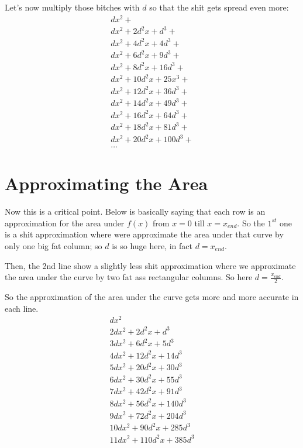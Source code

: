 \documentclass{report}
\begin{document}
Let's now multiply those bitches with $d$ so that the shit gets spread even
more:
\[\begin{split}
  dx^2 + \\
  dx^2 + 2d^2x + d^3 + \\
  dx^2 + 4d^2x + 4d^3 + \\
  dx^2 + 6d^2x + 9d^3 + \\
  dx^2 + 8d^2x + 16d^3 + \\
  dx^2 + 10d^2x + 25x^3 + \\
  dx^2+12d^2x   +36d^3 + \\
  dx^2+14d^2x   +49d^3 + \\
  dx^2+16d^2x   +64d^3 + \\
  dx^2+18d^2x   +81d^3 + \\
  dx^2+20d^2x   +100d^3 + \\
  \ldots
\end{split}\]

\section{Approximating the Area}
Now this is a critical point. Below is basically saying that each row is an
approximation for the area under $f(x)$ from $x = 0$ till $x = x_{end}$. So the
$1^{st}$ one is a shit approximation where were approximate the area under that
curve by only one big fat column; so $d$ is so huge here, in fact $d =
x_{end}$.

Then, the 2nd line show a slightly less shit approximation where we approximate
the area under the curve by two fat ass rectangular columns. So here $d =
\frac{x_{end}}{2}$.

So the approximation of the area under the curve gets more and more accurate in
each line.
\[\begin{split}
  dx^2\\
  2dx^2 + 2d^2x + d^3\\
  3dx^2 + 6d^2x + 5d^3\\
  4dx^2 + 12d^2x + 14d^3\\
  5dx^2 + 20d^2x + 30d^3\\
  6dx^2 + 30d^2x + 55d^3\\
  7dx^2 + 42d^2x + 91d^3\\
  8dx^2 + 56d^2x + 140d^3\\
  9dx^2 + 72d^2x + 204d^3\\
  10dx^2 + 90d^2x + 285d^3\\
  11dx^2 + 110d^2x + 385d^3\\
\end{split}\]
\end{document}
